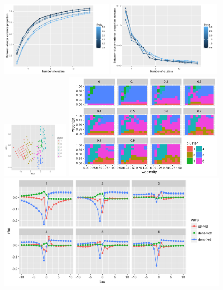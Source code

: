 \begin{figure}%
\centering
\includegraphics[width=0.49\textwidth]{Figures/CausalityRegimes/ccoef-knum_valuesFALSE_theta05-3.pdf}
\includegraphics[width=0.49\textwidth]{Figures/CausalityRegimes/dccoef-knum_valuesFALSEtheta05-3.pdf}\\
\includegraphics[width=0.29\textwidth]{Figures/CausalityRegimes/clusters-PCA-features_valuesFALSEtheta2_k6}
\includegraphics[width=0.69\textwidth]{Figures/CausalityRegimes/clusters-paramfacet_valuesFALSEtheta2_k6}\\
\includegraphics[width=\textwidth]{Figures/CausalityRegimes/clusters-centertrajs-facetclust_valuesFALSEtheta2_k6}

\end{figure}
